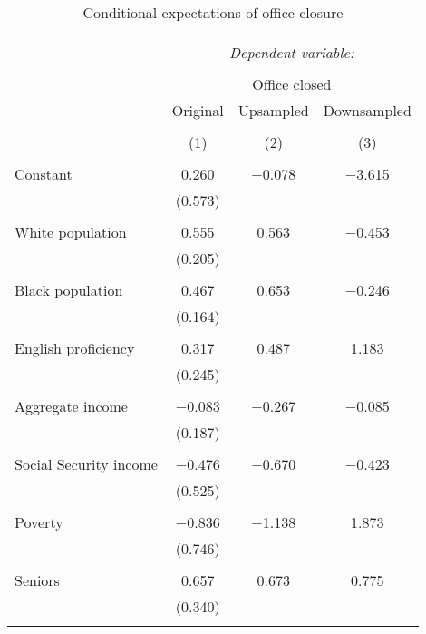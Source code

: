 
\begin{table}[!htbp] \centering 
  \caption{Conditional expectations of office closure} 
  \label{} 
\footnotesize 
\begin{tabular}{@{\extracolsep{5pt}}lccc} 
\\[-1.8ex]\hline 
\hline \\[-1.8ex] 
 & \multicolumn{3}{c}{\textit{Dependent variable:}} \\ 
\cline{2-4} 
\\[-1.8ex] & \multicolumn{3}{c}{Office closed} \\ 
 & Original & Upsampled & Downsampled \\ 
\\[-1.8ex] & (1) & (2) & (3)\\ 
\hline \\[-1.8ex] 
 Constant & 0.260 & $-$0.078 & $-$3.615 \\ 
  & (0.573) &  &  \\ 
  & & & \\ 
 White population & 0.555 & 0.563 & $-$0.453 \\ 
  & (0.205) &  &  \\ 
  & & & \\ 
 Black population & 0.467 & 0.653 & $-$0.246 \\ 
  & (0.164) &  &  \\ 
  & & & \\ 
 English proficiency & 0.317 & 0.487 & 1.183 \\ 
  & (0.245) &  &  \\ 
  & & & \\ 
 Aggregate income & $-$0.083 & $-$0.267 & $-$0.085 \\ 
  & (0.187) &  &  \\ 
  & & & \\ 
 Social Security income & $-$0.476 & $-$0.670 & $-$0.423 \\ 
  & (0.525) &  &  \\ 
  & & & \\ 
 Poverty & $-$0.836 & $-$1.138 & 1.873 \\ 
  & (0.746) &  &  \\ 
  & & & \\ 
 Seniors & 0.657 & 0.673 & 0.775 \\ 
  & (0.340) &  &  \\ 
  & & & \\ 

\end{tabular}
\end{table}
